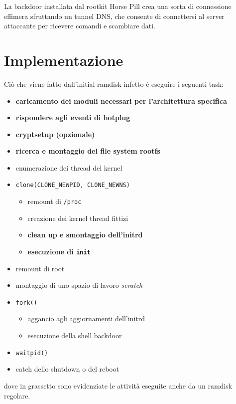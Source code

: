 \documentclass{article}
\begin{document}
La backdoor installata dal rootkit Horse Pill crea una sorta di connessione effimera sfruttando un tunnel DNS, che consente di connettersi al server attaccante per ricevere comandi e scambiare dati.

\newpage
\section{Implementazione}
Ciò che viene fatto dall'initial ramdisk infetto è eseguire i seguenti task:
\begin{itemize}
	\item \textbf{caricamento dei moduli necessari per l'architettura specifica}
	\item \textbf{rispondere agli eventi di hotplug}
	\item \textbf{cryptsetup (opzionale)}
	\item \textbf{ricerca e montaggio del file system rootfs}
	\item enumerazione dei thread del kernel
	\item \texttt{clone(CLONE\_NEWPID, CLONE\_NEWNS)}
	\begin{itemize}
		\item remount di \texttt{/proc}
		\item creazione dei kernel thread fittizi
		\item \textbf{clean up e smontaggio dell'initrd}
		\item \textbf{esecuzione di \texttt{init}}
	\end{itemize}
	\item remount di root
	\item montaggio di uno spazio di lavoro \textsl{scratch}
	\item \texttt{fork()}
	\begin{itemize}
		\item aggancio agli aggiornamenti dell'initrd
		\item esecuzione della shell backdoor
	\end{itemize}
	\item \texttt{waitpid()}
	\item catch dello shutdown o del reboot
\end{itemize}
dove in grassetto sono evidenziate le attività eseguite anche da un ramdisk regolare.
\end{document}
